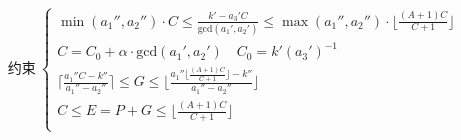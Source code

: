 \documentclass[preview]{standalone}
\begin{document}
\begin{align*}
\text{约束}~\begin{cases}\min (a_1'', a_2'') \cdot C \leq \frac{k' - a_3' C}{\mathrm{gcd}(a_1', a_2')} \leq \max (a_1'', a_2'') \cdot \lfloor \frac{(A + 1)C}{C + 1} \rfloor \\C = C_0 + \alpha \cdot \mathrm{gcd}(a_1', a_2') \quad C_0 = k' (a_3')^{-1} \\\lceil \frac{a_1'' C - k''}{a_1'' - a_2''} \rceil \leq G \leq \lfloor \frac{a_1'' \lfloor \frac{(A + 1)C}{C + 1} \rfloor - k''}{a_1'' - a_2''} \rfloor \\C \leq E = P + G \leq \lfloor \frac{(A + 1)C}{C + 1} \rfloor \\\end{cases}
\end{align*}
\end{document}
